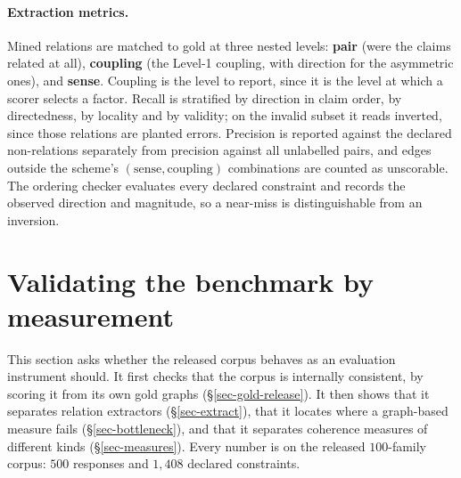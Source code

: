 \paragraph{Extraction metrics.} Mined relations are matched to gold at three nested levels: \textbf{pair}
(were the claims related at all), \textbf{coupling} (the Level-1 coupling, with direction for the asymmetric
ones), and \textbf{sense}. Coupling is the level to report, since it is the level at which a scorer selects a
factor. Recall is stratified by direction in claim order, by directedness, by locality and by validity; on the
invalid subset it reads inverted, since those relations are planted errors. Precision is reported against the
declared non-relations separately from precision against all unlabelled pairs, and edges outside the scheme's
$(\text{sense},\text{coupling})$ combinations are counted as unscorable. The ordering checker evaluates every
declared constraint and records the observed direction and magnitude, so a near-miss is distinguishable from an
inversion.

\section{Validating the benchmark by measurement}
\label{sec-experiments}

This section asks whether the released corpus behaves as an evaluation instrument should. It first checks that
the corpus is internally consistent, by scoring it from its own gold graphs (\S\ref{sec-gold-release}). It then
shows that it separates relation extractors (\S\ref{sec-extract}), that it locates where a graph-based measure
fails (\S\ref{sec-bottleneck}), and that it separates coherence measures of different kinds
(\S\ref{sec-measures}). Every number is on the released $100$-family corpus: $500$ responses and $1{,}408$
declared constraints.

